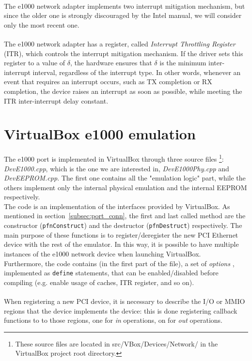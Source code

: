 \documentclass[a4paper, 12pt, titlepage]{report}
\begin{document}
\\
The e1000 network adapter implements two interrupt mitigation mechanism, but since the older one is strongly discouraged by the Intel manual, we will consider only the most recent one.
\\
\\
The e1000 network adapter has a register, called \textit{Interrupt Throttling Register} (ITR), which controls the interrupt mitigation mechanism. If the driver sets this register to a value of $\delta$, the hardware ensures that $\delta$ is the minimum inter-interrupt interval, regardless of the interrupt type. In other words, whenever an event that requires an interrupt occurs, such as TX completion or RX completion, the device raises an interrupt as soon as possible, while meeting the ITR inter-interrupt delay constant.
\section{VirtualBox e1000 emulation}  \label{sec:e1000_emu}
The e1000 port is implemented in VirtualBox through three source files \footnote{These source files are located in src/VBox/Devices/Network/ in the VirtualBox project root directory.}: \textit{DevE1000.cpp}, which is the one we are interested in, \textit{DevE1000Phy.cpp} and \textit{DevEEPROM.cpp}. The first one contains all the "emulation logic" part, while the others implement only the internal physical emulation and the internal EEPROM respectively.
\\
The code is an implementation of the interfaces provided by VirtualBox. As mentioned in section~\ref{subsec:port_conn}, the first and last called method are the constructor (\texttt{pfnConstruct}) and the destructor (\texttt{pfnDestruct}) respectively. The main purpose of these functions is to register/deregister the new PCI Ethernet device with the rest of the emulator. In this way, it is possible to have multiple instances of the e1000 network device when launching VirtualBox.
\\
Furthermore, the code contains (in the first part of the file), a set of \textit{options} , implemented as \texttt{define} statements, that can be enabled/disabled before compiling (e.g. enable usage of caches, ITR register, and so on).
\\
\\
When registering a new PCI device, it is necessary to describe the I/O or MMIO regions that the device implements the device: this is done registering callback functions to to those regions, one for \textit{in} operations, on for \textit{out} operations.
\end{document}
